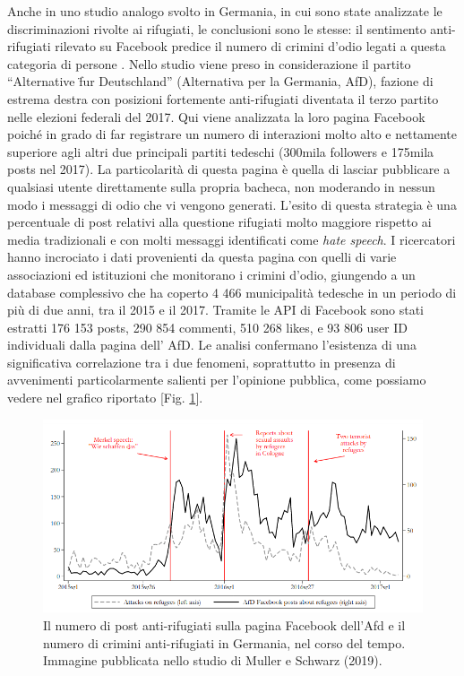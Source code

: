 Anche in uno studio analogo svolto in Germania, in cui sono state analizzate le discriminazioni rivolte ai rifugiati, le conclusioni sono le stesse: il sentimento anti-rifugiati rilevato su Facebook predice il numero di crimini d'odio legati a questa categoria di persone  \citep{muller2019}. Nello studio viene preso in considerazione il partito “Alternative f̈ur Deutschland” (Alternativa per la Germania, AfD), fazione di estrema destra con posizioni fortemente anti-rifugiati diventata il terzo partito nelle elezioni federali del 2017. Qui viene analizzata la loro pagina Facebook poiché in grado di far registrare un numero di interazioni molto alto e nettamente superiore agli altri due principali partiti tedeschi (300mila followers e 175mila posts nel 2017). La particolarità di questa pagina è quella di lasciar pubblicare a qualsiasi utente direttamente sulla propria bacheca, non moderando in nessun modo i messaggi di odio che vi vengono generati. L’esito di questa strategia è  una percentuale di post relativi alla questione rifugiati molto maggiore rispetto ai media tradizionali e con molti messaggi identificati come \textit{hate speech}. I ricercatori hanno incrociato  i dati provenienti da  questa pagina con quelli di varie associazioni ed istituzioni che monitorano i crimini d'odio, giungendo a un database complessivo che ha coperto  4 466 municipalità tedesche in un periodo di più di due anni, tra il 2015 e il 2017. Tramite le API di Facebook sono stati  estratti 176 153 posts, 290 854 commenti, 510 268 likes, e 93 806 user ID individuali dalla pagina dell' AfD. Le analisi confermano l’esistenza di una significativa correlazione tra i due fenomeni, soprattutto in presenza di avvenimenti particolarmente salienti per l'opinione pubblica, come possiamo vedere nel grafico riportato [Fig. \ref{fig:afd}].
\begin{figure}
	\includegraphics[width=\textwidth]{figures/afd}
	\caption{Il numero di post anti-rifugiati sulla pagina Facebook dell'Afd e il numero di crimini anti-rifugiati in Germania, nel corso del tempo. Immagine pubblicata nello studio di Muller e Schwarz (2019).}
	\label{fig:afd}
\end{figure}

